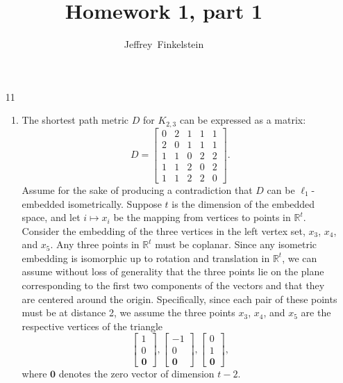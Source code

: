 \documentclass{article}
\author{Jeffrey~Finkelstein}
\title{Homework 1, part 1}
\newcommand{\R}{\mathbb{R}}
\newcommand{\0}{\mathbf{0}}
\begin{document}
\maketitle

\begin{enumerate}
\item[11]
  \begin{enumerate}
  \item
    The shortest path metric $D$ for $K_{2,3}$ can be expressed as a matrix:
    \begin{equation*}
      D =
      \begin{bmatrix}
        0 & 2 & 1 & 1 & 1 \\
        2 & 0 & 1 & 1 & 1 \\
        1 & 1 & 0 & 2 & 2 \\
        1 & 1 & 2 & 0 & 2 \\
        1 & 1 & 2 & 2 & 0
      \end{bmatrix}
      .
    \end{equation*}
    Assume for the sake of producing a contradiction that $D$ can be $\ell_1$-embedded isometrically.
    Suppose $t$ is the dimension of the embedded space, and let $i \mapsto x_i$ be the mapping from vertices to points in $\R^t$.
    Consider the embedding of the three vertices in the left vertex set, $x_3$, $x_4$, and $x_5$.
    Any three points in $\R^t$ must be coplanar.
    Since any isometric embedding is isomorphic up to rotation and translation in $\R^t$, we can assume without loss of generality that the three points lie on the plane corresponding to the first two components of the vectors and that they are centered around the origin.
    Specifically, since each pair of these points must be at distance 2, we assume the three points $x_3$, $x_4$, and $x_5$ are the respective vertices of the triangle
    \begin{equation*}
      \begin{bmatrix}
        1 \\ 0 \\ \0
      \end{bmatrix},
      \begin{bmatrix}
        -1 \\ 0 \\ \0
      \end{bmatrix},
      \begin{bmatrix}
        0 \\ 1 \\ \0
      \end{bmatrix},
    \end{equation*}
    where $\0$ denotes the zero vector of dimension $t - 2$.


\end{enumerate}
\end{enumerate}
\end{document}
